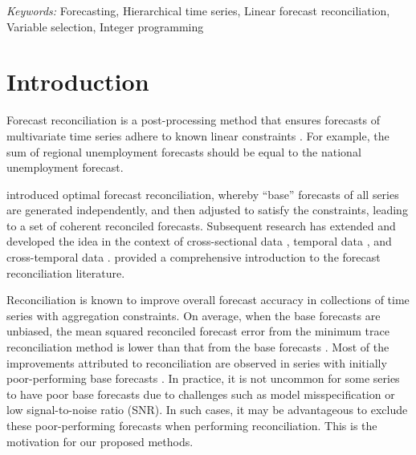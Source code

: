 \documentclass[
  11pt]{article}
\theoremstyle{plain}
\theoremstyle{remark}
\begin{document}
\noindent%
{\it Keywords:} Forecasting, Hierarchical time series, Linear forecast
reconciliation, Variable selection, Integer programming
\vfill

\newpage
\section{Introduction}\label{sec-introduction}

Forecast reconciliation is a post-processing method that ensures
forecasts of multivariate time series adhere to known linear constraints
\citep{Hyndman2011-sd}. For example, the sum of regional unemployment
forecasts should be equal to the national unemployment forecast.

\citet{Hyndman2011-sd} introduced optimal forecast reconciliation,
whereby ``base'' forecasts of all series are generated independently,
and then adjusted to satisfy the constraints, leading to a set of
coherent reconciled forecasts. Subsequent research has extended and
developed the idea in the context of cross-sectional data
\citep{Hyndman2016-cz, Wickramasuriya2019-fc, Panagiotelis2021-mf},
temporal data \citep{Athanasopoulos2017-jj}, and cross-temporal data
\citep{Di_Fonzo2023-vo}. \citet{Athanasopoulos2024-sm} provided a
comprehensive introduction to the forecast reconciliation literature.

Reconciliation is known to improve overall forecast accuracy in
collections of time series with aggregation constraints. On average,
when the base forecasts are unbiased, the mean squared reconciled
forecast error from the minimum trace reconciliation method
\citep{Wickramasuriya2019-fc} is lower than that from the base forecasts
\citep{Wickramasuriya2021-am}. Most of the improvements attributed to
reconciliation are observed in series with initially poor-performing
base forecasts \citep{Athanasopoulos2017-jj}. In practice, it is not
uncommon for some series to have poor base forecasts due to challenges
such as model misspecification or low signal-to-noise ratio (SNR). In
such cases, it may be advantageous to exclude these poor-performing
forecasts when performing reconciliation. This is the motivation for our
proposed methods.
\end{document}

